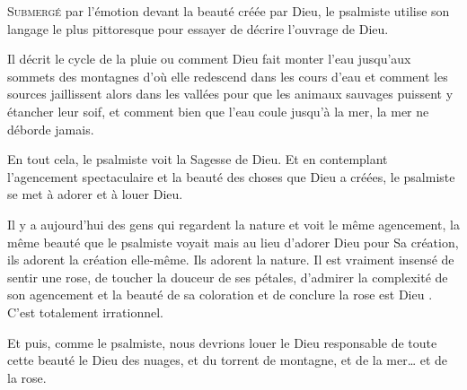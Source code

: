 \dvmonth




\lettrine{S}{ubmergé} par l'émotion devant la beauté créée par Dieu,
 le psalmiste utilise son langage le plus pittoresque pour essayer
 de décrire l'ouvrage de Dieu.

Il décrit le cycle de la pluie ou comment Dieu fait monter l'eau
 jusqu'aux sommets des montagnes d'où elle redescend dans les cours d'eau
 et comment les sources jaillissent alors dans les vallées pour que les animaux
 sauvages puissent y étancher leur soif, et comment bien que l'eau coule
 jusqu'à la mer, la mer ne déborde jamais.

En tout cela, le psalmiste voit la Sagesse de Dieu.
 Et en contemplant l'agencement spectaculaire et la beauté des choses que Dieu
 a créées, le psalmiste se met à adorer et à louer Dieu.

Il y a aujourd'hui des gens qui regardent la nature et voit le même agencement,
 la même beauté que le psalmiste voyait \ocadr{}mais au lieu d'adorer Dieu pour
 Sa création, ils adorent la création elle-même. Ils adorent la nature.
 Il est vraiment insensé de sentir une rose,
 de toucher la douceur de ses pétales, d'admirer la complexité de son agencement
 et la beauté de sa coloration et de conclure \Og la rose est Dieu \Fg{}.
 C'est totalement irrationnel. 


Et puis, comme le psalmiste, nous devrions louer le Dieu responsable
 de toute cette beauté \ocadr{}le Dieu des nuages, et du torrent de montagne,
 et de la mer\dots{} et de la rose. 

\dvrule



